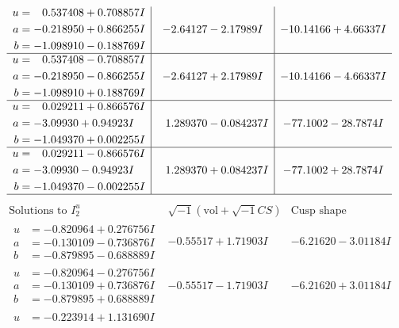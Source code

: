 \documentclass[1p]{elsarticle_modified}
\theoremstyle{definition}
\newcommand{\I}{\sqrt{-1}}
\begin{document}
$$\begin{array}{c|c|c}
\begin{aligned}
u &= \phantom{-}0.537408 + 0.708857 I \\
a &= -0.218950 + 0.866255 I \\
b &= -1.098910 - 0.188769 I\end{aligned}
 & -2.64127 - 2.17989 I & -10.14166 + 4.66337 I \\ \hline\begin{aligned}
u &= \phantom{-}0.537408 - 0.708857 I \\
a &= -0.218950 - 0.866255 I \\
b &= -1.098910 + 0.188769 I\end{aligned}
 & -2.64127 + 2.17989 I & -10.14166 - 4.66337 I \\ \hline\begin{aligned}
u &= \phantom{-}0.029211 + 0.866576 I \\
a &= -3.09930 + 0.94923 I \\
b &= -1.049370 + 0.002255 I\end{aligned}
 & \phantom{-}1.289370 - 0.084237 I & -77.1002 - 28.7874 I \\ \hline\begin{aligned}
u &= \phantom{-}0.029211 - 0.866576 I \\
a &= -3.09930 - 0.94923 I \\
b &= -1.049370 - 0.002255 I\end{aligned}
 & \phantom{-}1.289370 + 0.084237 I & -77.1002 + 28.7874 I\\
 \hline 
 \end{array}$$\newpage$$\begin{array}{c|c|c}  
\text{Solutions to }I^u_{2}& \I (\text{vol} + \sqrt{-1}CS) & \text{Cusp shape}\\
 \hline 
\begin{aligned}
u &= -0.820964 + 0.276756 I \\
a &= -0.130109 - 0.736876 I \\
b &= -0.879895 - 0.688889 I\end{aligned}
 & -0.55517 + 1.71903 I & -6.21620 - 3.01184 I \\ \hline\begin{aligned}
u &= -0.820964 - 0.276756 I \\
a &= -0.130109 + 0.736876 I \\
b &= -0.879895 + 0.688889 I\end{aligned}
 & -0.55517 - 1.71903 I & -6.21620 + 3.01184 I \\ \hline\begin{aligned}
u &= -0.223914 + 1.131690 I \\

\end{aligned}
\end{array}$$
\end{document}
